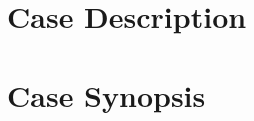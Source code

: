 \documentclass[12pt]{article}
\begin{document}


\section*{Case Description}



\section*{Case Synopsis}

\end{document}
